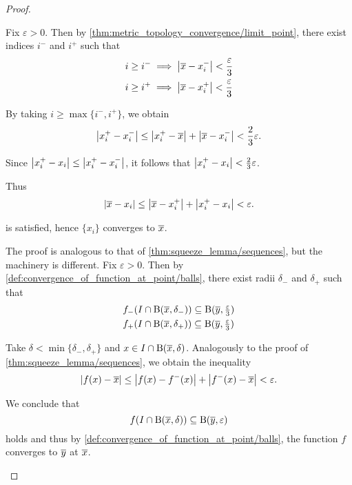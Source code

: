 \begin{proof}
  \begin{description}
     Fix \( \varepsilon > 0 \). Then by \cref{thm:metric_topology_convergence/limit_point}, there exist indices \( i^- \) and \( i^+ \) such that
    \begin{align*}
      &i \geq i^- \implies \left\vert \overline{x} - x_i^- \right\vert < \frac \varepsilon 3 \\
      &i \geq i^+ \implies \left\vert \overline{x} - x_i^+ \right\vert < \frac \varepsilon 3
    \end{align*}

    By taking \( i \geq \max \{ i^-, i^+ \} \), we obtain
    \begin{equation*}
      \left\vert x_i^+ - x_i^- \right\vert \leq \left\vert x_i^+ - \overline{x} \right\vert + \left\vert \overline{x} - x_i^- \right\vert < \frac 2 3 \varepsilon.
    \end{equation*}

    Since \( \left\vert x_i^+ - x_i \right\vert \leq \left\vert x_i^+ - x_i^- \right\vert \), it follows that \( \left\vert x_i^+ - x_i \right\vert < \frac 2 3 \varepsilon \).

    Thus
    \begin{equation*}
      \left\vert \overline{x} - x_i \right\vert \leq \left\vert \overline{x} - x_i^+ \right\vert + \left\vert x_i^+ - x_i \right\vert < \varepsilon.
    \end{equation*}

     is satisfied, hence \( \{ x_i \} \) converges to \( \overline{x} \).

     The proof is analogous to that of \cref{thm:squeeze_lemma/sequences}, but the machinery is different. Fix \( \varepsilon > 0 \). Then by \cref{def:convergence_of_function_at_point/balls}, there exist radii \( \delta_- \) and \( \delta_+ \) such that
    \begin{align*}
      &f_-(I \cap \operatorname{B}(\overline{x}, \delta_-)) \subseteq \operatorname{B}(\overline{y}, \tfrac \varepsilon 3) \\
      &f_+(I \cap \operatorname{B}(\overline{x}, \delta_+)) \subseteq \operatorname{B}(\overline{y}, \tfrac \varepsilon 3)
    \end{align*}

    Take \( \delta < \min \{ \delta_-, \delta_+ \} \) and \( x \in I \cap \operatorname{B}(\overline{x}, \delta) \). Analogously to the proof of \cref{thm:squeeze_lemma/sequences}, we obtain the inequality
    \begin{equation*}
      \left\vert f(x) - \overline{x} \right\vert \leq \left\vert f(x) - f^-(x) \right\vert + \left\vert f^-(x) - \overline{x} \right\vert < \varepsilon.
    \end{equation*}

    We conclude that
    \begin{equation*}
      f(I \cap \operatorname{B}(\overline{x}, \delta)) \subseteq \operatorname{B}(\overline{y}, \varepsilon)
    \end{equation*}
    holds and thus by \cref{def:convergence_of_function_at_point/balls}, the function \( f \) converges to \( \overline{y} \) at \( \overline{x} \).
  \end{description}
\end{proof}
